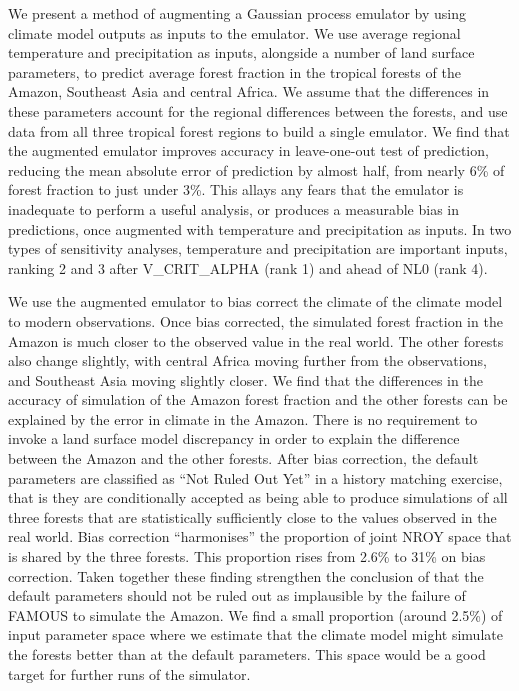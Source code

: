\documentclass[gmd, manuscript]{copernicus}
\begin{document}
We present a method of augmenting a Gaussian process emulator by using climate model outputs as inputs to the emulator. We use average regional temperature and precipitation as inputs, alongside a number of land surface parameters, to predict average forest fraction in the tropical forests of the Amazon, Southeast Asia and central Africa. We assume that the differences in these parameters account for the regional differences between the forests, and use data from all three tropical forest regions to build a single emulator. We find that the augmented emulator improves accuracy in leave-one-out test of prediction, reducing the mean absolute error of prediction by almost half, from nearly 6\% of forest fraction to just under 3\%. This allays any fears that the emulator is inadequate to perform a useful analysis, or produces a measurable bias in predictions, once augmented with temperature and precipitation as inputs. In two types of sensitivity analyses, temperature and precipitation are important inputs, ranking 2 and 3 after V\_CRIT\_ALPHA (rank 1) and ahead of NL0 (rank 4).

We use the augmented emulator to bias correct the climate of the climate model to modern observations. Once bias corrected, the simulated forest fraction in the Amazon is much closer to the observed value in the real world. The other forests also change slightly, with central Africa moving further from the observations, and Southeast Asia moving slightly closer. We find that the differences in the accuracy of simulation of the Amazon forest fraction and the other forests can be explained by the error in climate in the Amazon. There is no requirement to invoke a land surface model discrepancy in order to explain the difference between the Amazon and the other forests. After bias correction, the default parameters are classified as ``Not Ruled Out Yet'' in a history matching exercise, that is they are conditionally accepted as being able to produce simulations of all three forests that are statistically sufficiently close to the values observed in the real world. Bias correction ``harmonises'' the proportion of joint NROY space that is shared by the three forests. This proportion rises from 2.6\% to 31\% on bias correction. Taken together these finding strengthen the conclusion of \cite{mcneall2016impact} that the default parameters should not be ruled out as implausible by the failure of FAMOUS to simulate the Amazon. We find a small proportion (around 2.5\%) of input parameter space where we estimate that the climate model might simulate the forests better than at the default parameters. This space would be a good target for further runs of the simulator.
\end{document}
